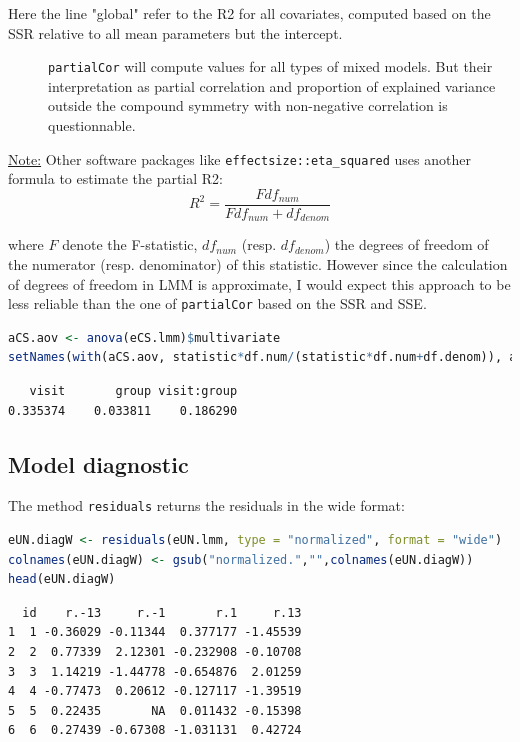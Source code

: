 \documentclass[12pt]{article}
\newcommand\Warning[1][3ex]{%
\renewcommand\stacktype{L}%
\scaleto{\stackon[1.3pt]{\color{red}$\triangle$}{\tiny\bfseries !}}{#1}%
\xspace
}
\begin{document}
Here the line "global" refer to the R2 for all covariates, computed
based on the SSR relative to all mean parameters but the intercept.
\begin{description}
\item[{\Warning}] \texttt{partialCor} will compute values for all types of mixed
models. But their interpretation as partial correlation and
proportion of explained variance outside the compound symmetry with
non-negative correlation is questionnable.
\end{description}

\bigskip

\uline{Note:} Other software packages like \texttt{effectsize::eta\_squared} uses
another formula to estimate the partial R2:
\[ R^2=\frac{F df_{num}}{F df_{num} + df_{denom}} \]

where \(F\) denote the F-statistic, \(df_{num}\)
(resp. \(df_{denom}\)) the degrees of freedom of the numerator
(resp. denominator) of this statistic. However since the calculation
of degrees of freedom in LMM is approximate, I would expect this
approach to be less reliable than the one of \texttt{partialCor} based on the
SSR and SSE.

\begin{lstlisting}[language=r,numbers=none]
aCS.aov <- anova(eCS.lmm)$multivariate
setNames(with(aCS.aov, statistic*df.num/(statistic*df.num+df.denom)), aCS.aov$test)
\end{lstlisting}

\label{}
\begin{verbatim}
   visit       group visit:group 
0.335374    0.033811    0.186290
\end{verbatim}



\bigskip


\clearpage
\subsection{Model diagnostic}
\label{sec:org712ad55}

The method \texttt{residuals} returns the residuals in the wide format:
\begin{lstlisting}[language=r,numbers=none]
eUN.diagW <- residuals(eUN.lmm, type = "normalized", format = "wide")
colnames(eUN.diagW) <- gsub("normalized.","",colnames(eUN.diagW))
head(eUN.diagW)
\end{lstlisting}

\label{}
\begin{verbatim}
  id    r.-13     r.-1       r.1     r.13
1  1 -0.36029 -0.11344  0.377177 -1.45539
2  2  0.77339  2.12301 -0.232908 -0.10708
3  3  1.14219 -1.44778 -0.654876  2.01259
4  4 -0.77473  0.20612 -0.127117 -1.39519
5  5  0.22435       NA  0.011432 -0.15398
6  6  0.27439 -0.67308 -1.031131  0.42724
\end{verbatim}
\end{document}
